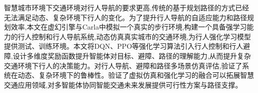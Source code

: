 \begin{abstractzh}

智慧城市环境下交通环境对行人导航的要求更高,传统的基于规划路径的方式已经无法满足动态、复杂环境下行人的变化。为了提升行人导航的自适应能力和路径规划效率,本文在虚幻引擎与Carla中模拟一个真实的步行环境,构建一个具备强学习能力的行人控制和行人导航系统,动态仿真真实城市的交通环境,为行人强化学习模型提供测试、训练环境。本文将DQN、PPO等强化学习算法引入行人控制和行人避障,设计多维度奖励函数提升智能体对目标、避障、路径的理解能力,从而提升复杂交通环境下行人的决策能力。对行人导航、避障和路径多场景仿真评估,验证了系统在动态、复杂环境下的鲁棒性。验证了虚拟仿真和强化学习的融合可以拓展智慧交通应用领域,对多智能体协同智能交通未来发展提供可行性方案与路径支撑。

\end{abstractzh}
